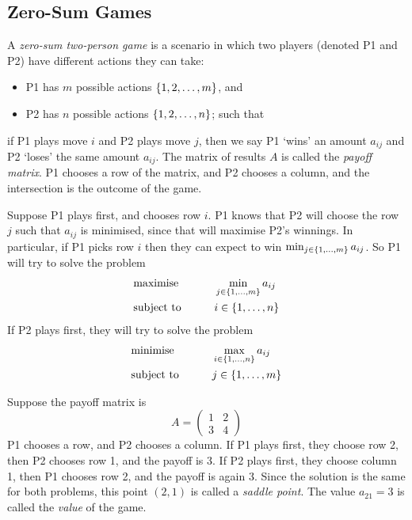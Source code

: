 \subsection{Zero-Sum Games}
\begin{definition}
    A \textit{zero-sum two-person game} is a scenario in which two players (denoted P1 and P2) have different actions they can take:
    \begin{itemize}
        \item P1 has \( m \) possible actions \( \qty{1, 2, \dots, m } \), and
        \item P2 has \( n \) possible actions \( \qty{1, 2, \dots, n } \); such that
    \end{itemize}
    if P1 plays move \( i \) and P2 plays move \( j \), then we say P1 `wins' an amount \( a_{ij} \) and P2 `loses' the same amount \( a_{ij} \).
    The matrix of results \( A \) is called the \textit{payoff matrix}.
    P1 chooses a row of the matrix, and P2 chooses a column, and the intersection is the outcome of the game.
\end{definition}
Suppose P1 plays first, and chooses row \( i \).
P1 knows that P2 will choose the row \( j \) such that \( a_{ij} \) is minimised, since that will maximise P2's winnings.
In particular, if P1 picks row \( i \) then they can expect to win \( \min_{j \in \qty{1,\dots,m}} a_{ij} \).
So P1 will try to solve the problem
\begin{alignat*}{2}
    & \text{maximise} & \qquad & \min_{j \in \qty{1,\dots,m}} a_{ij}            \\
    & \text{subject to}                                &        &i \in \qty{1,\dots,n}
\end{alignat*}
If P2 plays first, they will try to solve the problem
\begin{alignat*}{2}
    & \text{minimise} & \qquad & \max_{i \in \qty{1,\dots,n}} a_{ij}            \\
    & \text{subject to}                                &        &j \in \qty{1,\dots,m}
\end{alignat*}
\begin{example}
    Suppose the payoff matrix is
    \[ A = \begin{pmatrix}
        1 & 2 \\ 3 & 4
    \end{pmatrix} \]
    P1 chooses a row, and P2 chooses a column.
    If P1 plays first, they choose row 2, then P2 chooses row 1, and the payoff is 3.
    If P2 plays first, they choose column 1, then P1 chooses row 2, and the payoff is again 3.
    Since the solution is the same for both problems, this point \( (2,1) \) is called a \textit{saddle point}.
    The value \( a_{21} = 3 \) is called the \textit{value} of the game.
\end{example}
